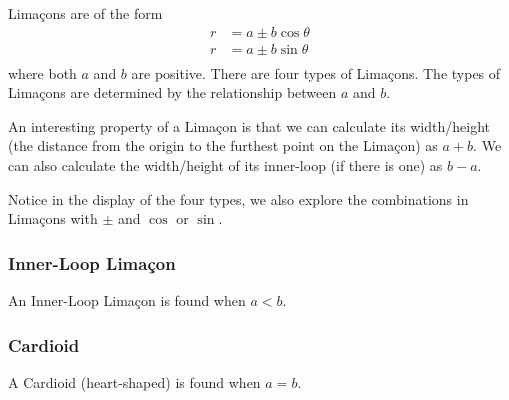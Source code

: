 \documentclass[11pt]{article}
\begin{document}
Limaçons are of the form
\begin{align*}
    r &= a \pm b\cos\theta \\
    r &= a \pm b\sin\theta \\
\end{align*}
where both $a$ and $b$ are positive. There are four types of Limaçons. The types of Limaçons are determined by the relationship between $a$ and $b$. 

An interesting property of a Limaçon is that we can calculate its width/height (the distance from the origin to the furthest point on the Limaçon) as $a+b$. We can also calculate the width/height of its inner-loop (if there is one) as $b - a$.

Notice in the display of the four types, we also explore the combinations in Limaçons with $\pm$ and $\cos$ or $\sin$.

\subsubsection*{Inner-Loop Limaçon}

An Inner-Loop Limaçon is found when $a < b$.

\begin{center}
\end{center}

\subsubsection*{Cardioid}

A Cardioid (heart-shaped) is found when $a = b$.

\begin{center}
\end{center}
\end{document}
